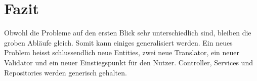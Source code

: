 \newpage
\section{Fazit}\label{architektur_fazit}

Obwohl die Probleme auf den ersten Blick sehr unterschiedlich sind, bleiben die groben Abläufe gleich. Somit kann einiges generalisiert werden. Ein neues Problem heisst schlussendlich neue Entities, zwei neue Translator, ein neuer Validator und ein neuer Einstiegspunkt für den Nutzer.  Controller, Services und Repositories werden generisch gehalten.



